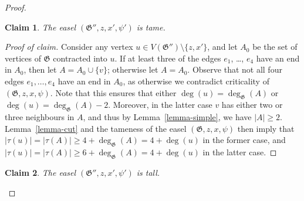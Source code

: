 \documentclass{article}
\newcommand\g{\mathfrak{G}}
\newtheorem*{claim*}{Claim}
\newenvironment{subproof}{%
  \renewcommand{\qedsymbol}{$\blacksquare$}%
  \begin{proof}[Proof of claim]%
}{%
  \end{proof}%
}
\begin{document}
\begin{proof}
\begin{claim*}
The easel $(\g'',z,x',\psi')$ is tame.
\end{claim*}

\begin{subproof}
 Consider any vertex $u\in V(\g'')\setminus\{z,x'\}$, and let $A_0$ be the set of vertices of $\g$ contracted into $u$.  If at least three of the edges $e_1$, \ldots, $e_4$ have an
end in $A_0$, then let $A=A_0\cup\{v\}$; otherwise let $A=A_0$. Observe that not all four edges $e_{1},\ldots,e_{4}$ have an end in $A_{0}$, as otherwise we contradict criticality of $(\g,z,x,\psi)$.  Note that this ensures that either $\deg(u)=\deg_{\g}(A)$
or $\deg(u)=\deg_{\g}(A)-2$.  Moreover, in the latter case $v$ has either two or three neighbours in $A$, and thus by Lemma~\ref{lemma-simple},
we have $|A|\ge 2$.  Lemma~\ref{lemma-cut} and the tameness of the easel $(\g,z,x,\psi)$ then imply that $|\tau(u)|=|\tau(A)|\ge 4+\deg_{\g}(A)=4+\deg(u)$ in the former case,
and $|\tau(u)|=|\tau(A)|\ge 6+\deg_{\g}(A)=4+\deg(u)$ in the latter case.
\end{subproof}

\begin{claim*}
The easel $(\g'',z,x',\psi')$ is tall.
\end{claim*}


\end{proof}
\end{document}
